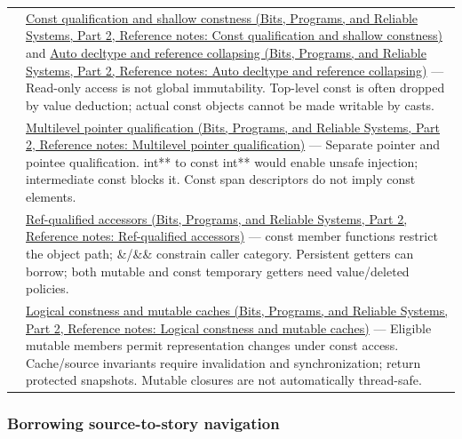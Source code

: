 {\begin{longtable}[]{@{}
  >{\raggedright\arraybackslash}p{}
  >{\raggedright\arraybackslash}p{}@{}}
123 & \href{../01-Bits-Programs-and-Reliable-Systems-P02/main.pdf\#nameddest=appendix-c25d60fed375}{Const qualification and shallow constness (Bits, Programs, and Reliable Systems, Part 2, Reference notes: Const qualification and shallow constness)} and \href{../01-Bits-Programs-and-Reliable-Systems-P02/main.pdf\#nameddest=appendix-5d4252a42886}{Auto decltype and reference collapsing (Bits, Programs, and Reliable Systems, Part 2, Reference notes: Auto decltype and reference collapsing)} --- Read-only access is not global immutability. Top-level const is often dropped by value deduction; actual const objects cannot be made writable by casts. \\
124 & \href{../01-Bits-Programs-and-Reliable-Systems-P02/main.pdf\#nameddest=appendix-5e1a7561cd98}{Multilevel pointer qualification (Bits, Programs, and Reliable Systems, Part 2, Reference notes: Multilevel pointer qualification)} --- Separate pointer and pointee qualification. int** to const int** would enable unsafe injection; intermediate const blocks it. Const span descriptors do not imply const elements. \\
125 & \href{../01-Bits-Programs-and-Reliable-Systems-P02/main.pdf\#nameddest=appendix-d42039b1d6f7}{Ref-qualified accessors (Bits, Programs, and Reliable Systems, Part 2, Reference notes: Ref-qualified accessors)} --- const member functions restrict the object path; \&/\&\& constrain caller category. Persistent getters can borrow; both mutable and const temporary getters need value/deleted policies. \\
126 & \href{../01-Bits-Programs-and-Reliable-Systems-P02/main.pdf\#nameddest=appendix-f5593256bcaf}{Logical constness and mutable caches (Bits, Programs, and Reliable Systems, Part 2, Reference notes: Logical constness and mutable caches)} --- Eligible mutable members permit representation changes under const access. Cache/source invariants require invalidation and synchronization; return protected snapshots. Mutable closures are not automatically thread-safe. \\
\end{longtable}
}

\subsubsection{Borrowing source-to-story navigation}\label{appendix-fd090d982a15-borrowing-source-to-story-navigation}

\hypertarget{appendix-fd090d982a15-borrowing-source-to-story-navigation}{}

